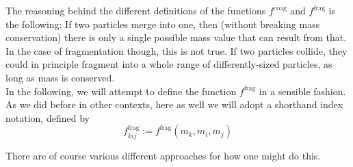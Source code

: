     The reasoning behind the different definitions of the functions $f^\text{coag}$ and
    $f^\text{frag}$ is the following: If two particles merge into one, then (without breaking mass
    conservation) there is only a single possible mass value that can result from that. \\
    
    In the case of fragmentation though, this is not true. 
    If two particles collide, they could in principle fragment into a whole range of 
    differently-sized particles, as long as mass is conserved. \\


    In the following, we will attempt to define the function $f^\text{frag}$ in a sensible fashion.
    As we did before in other contexts, here as well we will adopt a shorthand index notation,
    defined by 
    \begin{equation}
        f^\text{frag}_{kij} := f^\text{frag}(m_k, m_i, m_j)
    \end{equation}

    There are of course various different approaches for how one might do this.



